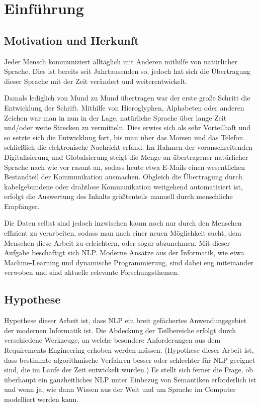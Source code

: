 \documentclass[12pt]{report}
\begin{document}
\chapter{Einführung}
\section{Motivation und Herkunft}
Jeder Mensch kommuniziert alltäglich mit Anderen mithilfe von natürlicher Sprache. Dies ist bereits seit Jahrtausenden so, jedoch hat sich die Übertragung dieser Sprache mit der Zeit verändert und weiterentwickelt.\cite{wei89}

Damals lediglich von Mund zu Mund übertragen war der erste große Schritt die Entwicklung der Schrift. Mithilfe von Hieroglyphen, Alphabeten oder anderen Zeichen war man in nun in der Lage, natürliche Sprache über lange Zeit und/oder weite Strecken zu vermitteln. Dies erwies sich als sehr Vorteilhaft und so setzte sich die Entwicklung fort, bis man über das Morsen und das Telefon schließlich die elektronische Nachricht erfand. 
Im Rahmen der voranschreitenden Digitalisierung und Globalsierung steigt die Menge an übertragener natürlicher Sprache nach wie vor rasant an, sodass heute etwa E-Mails einen wesentlichen Bestandteil der Kommunikation ausmachen. Obgleich die Übertragung durch kabelgebundene oder drahtlose Kommunikation weitgehend automatisiert ist, erfolgt die Auswertung des Inhalts größtenteils manuell durch menschliche Empfänger.

Die Daten selbst sind jedoch inzwischen kaum noch nur durch den Menschen effizient zu verarbeiten, sodass man nach einer neuen Möglichkeit sucht, dem Menschen diese Arbeit zu erleichtern, oder sogar abzunehmen. Mit dieser Aufgabe beschäftigt sich NLP. Moderne Ansätze aus der Informatik, wie etwa Machine-Learning und dynamische Programmierung, sind dabei eng miteinander verwoben und sind aktuelle relevante Forschungsthemen.

\section{Hypothese}
Hypothese dieser Arbeit ist, dass NLP ein breit gefächertes Anwendungsgebiet der modernen Informatik ist. Die Abdeckung der Teilbereiche erfolgt durch verschiedene Werkzeuge, an welche besondere Anforderungen aus dem Requirements Engineering erhoben werden müssen.
(Hypothese dieser Arbeit ist, dass bestimmte algorithmische Verfahren besser oder schlechter für NLP geeignet sind, die im Laufe der Zeit entwickelt wurden.) Es stellt sich ferner die Frage, ob überhaupt ein ganzheitliches NLP unter Einbezug von Semantiken erforderlich ist und wenn ja, wie dann Wissen aus der Welt und um Sprache im Computer modelliert werden kann. 
\end{document}

